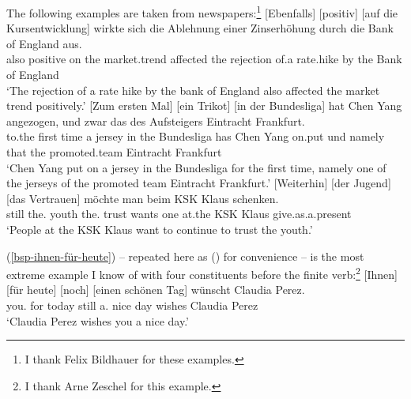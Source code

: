 The following examples are taken from newspapers:\footnote{
  I thank Felix Bildhauer for these examples.
}
\eal
\ex\label{bsp-ebenfalls-positiv} 
\gll {}[Ebenfalls] [positiv] [auf die Kursentwicklung] wirkte sich die Ablehnung einer Zinserhöhung durch die
Bank of England aus.\footnotemark\\
\spacebr{}also \spacebr{}positive \spacebr{}on the market.trend affected  the rejection of.a
rate.hike by the Bank of England \partic\\
\glt `The rejection of a rate hike by the bank of England also affected the market trend positively.'
\ex 
\gll {}[Zum ersten Mal]    [ein Trikot]    [in der Bundesliga]    hat    Chen Yang angezogen, und zwar das des Aufsteigers Eintracht Frankfurt.\footnotemark\\
    \spacebr{}to.the first time \spacebr{}a jersey in the Bundesliga has Chen Yang on.put  und
    namely that the promoted.team Eintracht Frankfurt\\
\glt `Chen Yang put on a jersey in the Bundesliga for the first time, namely one of the jerseys of
the promoted team Eintracht Frankfurt.'
\ex\label{bsp-weiterhin-derjugend}
\gll {}[Weiterhin]    [der Jugend]    [das Vertrauen]    möchte    man beim KSK Klaus schenken.\footnotemark\\
     \spacebr{}still  \spacebr{}the.\dat{} youth \spacebr{}the.\acc{} trust wants one at.the KSK Klaus give.as.a.present\\
\glt `People at the KSK Klaus want to continue to trust the youth.'
\zl

(\ref{bsp-ihnen-für-heute}) -- repeated here as () for convenience -- is the most extreme example I know of with four constituents before the finite verb:\footnote{
  I thank Arne Zeschel for this example.
}
\ea\label{bsp-ihnen-für-heute-zwei}
\gll {}[Ihnen] [für heute] [noch] [einen schönen Tag] wünscht Claudia Perez.\footnotemark\\
  \spacebr{}you.\dat{} \spacebr{}for today \spacebr{}still \spacebr{}a.\acc{} nice day wishes Claudia Perez\\
%
\glt `Claudia Perez wishes you a nice day.'
\z



